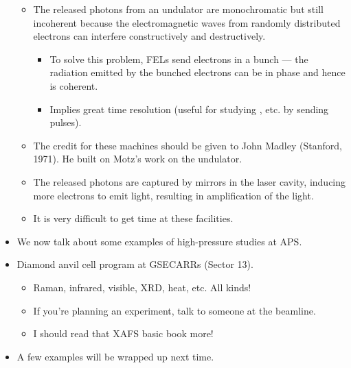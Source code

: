\documentclass[../notes.tex]{subfiles}
\begin{document}
\begin{itemize}
\begin{itemize}
\begin{itemize}
        \end{itemize}
        \item The released photons from an undulator are monochromatic but still incoherent because the electromagnetic waves from randomly distributed electrons can interfere constructively and destructively.
        \begin{itemize}
            \item To solve this problem, FELs send electrons in a bunch --- the radiation emitted by the bunched electrons can be in phase and hence is coherent.
            \item Implies great time resolution (useful for studying , etc. by sending pulses).
        \end{itemize}
        \item The credit for these machines should be given to John Madley (Stanford, 1971). He built on Motz's work on the undulator.
        \item The released photons are captured by mirrors in the laser cavity, inducing more electrons to emit light, resulting in amplification of the light.
        \item It is very difficult to get time at these facilities.
    \end{itemize}
    \item We now talk about some examples of high-pressure studies at APS.
    \item Diamond anvil cell program at GSECARRs (Sector 13).
    \begin{itemize}
        \item Raman, infrared, visible, XRD, heat, etc. All kinds!
        \item If you're planning an experiment, talk to someone at the beamline.
        \item I should read that XAFS basic book more!
    \end{itemize}
    \item A few examples will be wrapped up next time.
\end{itemize}
\end{document}

